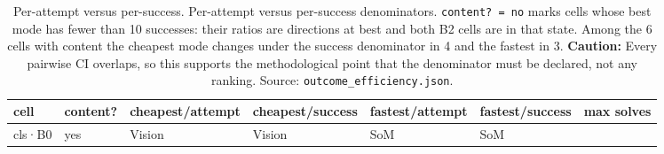 \begin{table}[tp]
\centering
\caption{Per-attempt versus per-success. Per-attempt versus per-success denominators. \texttt{content?\ =\ no} marks cells whose best mode has fewer than 10 successes: their ratios are directions at best and both B2 cells are in that state. Among the 6 cells with content the cheapest mode changes under the success denominator in 4 and the fastest in 3. \textbf{Caution:} Every pairwise CI overlaps, so this supports the methodological point that the denominator must be declared, not any ranking. Source: \texttt{outcome\_efficiency.json}.}
\label{tab:t15}
\footnotesize
\setlength{\tabcolsep}{3pt}
\begin{tabular}{@{}
  >{\raggedright\arraybackslash}p{}
  >{\raggedright\arraybackslash}p{}
  >{\raggedright\arraybackslash}p{}
  >{\raggedright\arraybackslash}p{}
  >{\raggedright\arraybackslash}p{}
  >{\raggedright\arraybackslash}p{}
  >{\raggedright\arraybackslash}p{}@{}}
\toprule
\begin{minipage}[b]{\linewidth}\raggedright
cell
\end{minipage} & \begin{minipage}[b]{\linewidth}\raggedright
content?
\end{minipage} & \begin{minipage}[b]{\linewidth}\raggedright
cheapest/attempt
\end{minipage} & \begin{minipage}[b]{\linewidth}\raggedright
cheapest/success
\end{minipage} & \begin{minipage}[b]{\linewidth}\raggedright
fastest/attempt
\end{minipage} & \begin{minipage}[b]{\linewidth}\raggedright
fastest/success
\end{minipage} & \begin{minipage}[b]{\linewidth}\raggedright
max solves
\end{minipage} \\
\midrule
cls·B0 & yes & Vision & Vision & SoM & SoM & 61 \\

\end{tabular}
\end{table}
